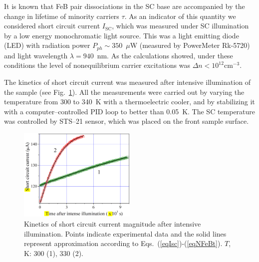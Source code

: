 \documentclass[sn-mathphys]{sn-jnl}%
\theoremstyle{thmstyleone}%
\theoremstyle{thmstyletwo}%
\theoremstyle{thmstylethree}%
\begin{document}
It is known that FeB pair dissociations in the SC base are accompanied by the change
in lifetime of minority carriers $\tau$.
As an indicator of this quantity we considered short circuit current $I_\mathrm{SC}$,
which was measured under SC illumination by a low energy monochromatic light source.
This was a light emitting diode (LED) with radiation power $P_{ph}\sim350$~$\mu$W
(measured by PowerMeter Rk-5720) and light wavelength $\lambda=940$~nm.
As the calculations showed, under these conditions the level of nonequilibrium carrier
excitations was $\Delta n<10^{12}$cm$^{-3}$.

The kinetics of short circuit current was measured after intensive illumination of the sample
(see Fig.~\ref{figIsc}).
All the measurements were carried out by varying the temperature from 300 to 340~K with a thermoelectric cooler,
and by stabilizing it with a computer--controlled PID loop to better than 0.05~K.
The SC temperature was controlled by STS--21 sensor, which was placed on the front sample surface.

\begin{figure}
\centering
\includegraphics[width=0.5\textwidth]{Fig2}
\caption{Kinetics of short circuit current magnitude after intensive illumination.
Points indicate experimental data and the solid lines represent approximation
according to Eqs.~(\ref{eqIsc})-(\ref{eqNFeBt}).
$T$, K: 300 (1), 330 (2).}
\label{figIsc}       %
\end{figure}
\end{document}
